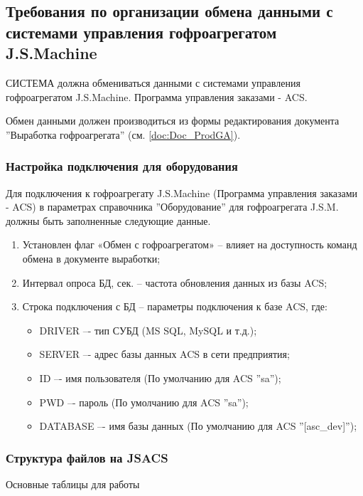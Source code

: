 \subsection{Требования по организации обмена данными с системами управления гофроагрегатом J.S.Machine}
\label{sec:BHS}

СИСТЕМА должна обмениваться данными с системами управления гофроагрегатом J.S.Machine. Программа управления заказами - ACS.

Обмен данными должен производиться из формы редактирования документа ''Выработка гофроагрегата'' (см. \ref{doc:Doc_ProdGA}).

\subsubsection{Настройка подключения для оборудования}

Для подключения к гофроагрегату J.S.Machine (Программа управления заказами - ACS)
в параметрах справочника ''Оборудование'' для гофроагрегата J.S.M. должны быть заполненные следующие данные.

\begin{enumerate}
\item Установлен флаг «Обмен с гофроагрегатом» – влияет на доступность команд обмена в документе выработки;
\item Интервал опроса БД, сек. – частота обновления данных из базы ACS;
\item Строка подключения с БД – параметры подключения к базе ACS, где:
\begin{itemize}
    \item DRIVER –- тип СУБД (MS SQL, MySQL и т.д.);
    \item SERVER –- адрес базы данных ACS в сети предприятия;
    \item ID –- имя пользователя (По умолчанию  для ACS ''sa'');
    \item PWD –- пароль (По умолчанию  для ACS ''sa'');
    \item DATABASE –- имя базы данных (По умолчанию для ACS ''[asc\_dev]'');
     
\end{itemize}
\end{enumerate}


\subsubsection{Структура файлов на JSACS}

Основные таблицы для работы

